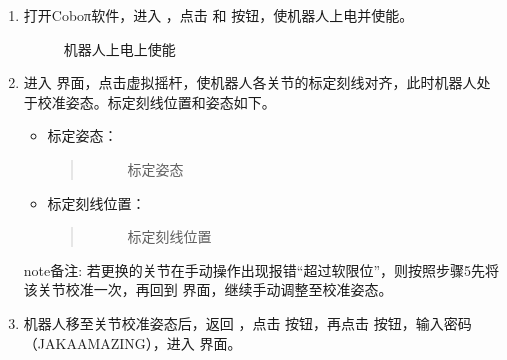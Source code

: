 \documentclass[a4paper,11pt,english,openany,oneside]{sphinxmanual}
\let\sphinxpxdimen\pdfpxdimen\else\newdimen\sphinxpxdimen
\begin{document}
\sphinxAtStartPar
{}
\begin{enumerate}
%
\item {} 
\sphinxAtStartPar
打开Coboπ软件，进入 ，点击  和  按钮，使机器人上电并使能。

\begin{figure}[H]
\centering
\capstart

\noindent{}
\caption{机器人上电上使能}\label{\detokenize{_u66f4_u6362_u5173_u8282:id162}}\end{figure}

\item {} 
\sphinxAtStartPar
进入  界面，点击虚拟摇杆，使机器人各关节的标定刻线对齐，此时机器人处于校准姿态。标定刻线位置和姿态如下。
\begin{itemize}
\item {} 
\sphinxAtStartPar
标定姿态：
\begin{quote}

\begin{figure}[H]
\centering
\capstart

\noindent{}
\caption{标定姿态}\label{\detokenize{_u66f4_u6362_u5173_u8282:id163}}\end{figure}
\end{quote}

\item {} 
\sphinxAtStartPar
标定刻线位置：
\begin{quote}

\begin{figure}[H]
\centering
\capstart

\noindent{}
\caption{标定刻线位置}\label{\detokenize{_u66f4_u6362_u5173_u8282:id164}}\end{figure}
\end{quote}

\end{itemize}

\begin{sphinxadmonition}{note}{备注:}
\sphinxAtStartPar
若更换的关节在手动操作出现报错“超过软限位”，则按照步骤5先将该关节校准一次，再回到  界面，继续手动调整至校准姿态。
\end{sphinxadmonition}

\item {} 
\sphinxAtStartPar
机器人移至关节校准姿态后，返回 ，点击 \sphinxincludegraphics[width=18\sphinxpxdimen]{{集合工具包按钮}.png} 按钮，再点击  按钮，输入密码（JAKAAMAZING），进入  界面。


\end{enumerate}
\end{document}
